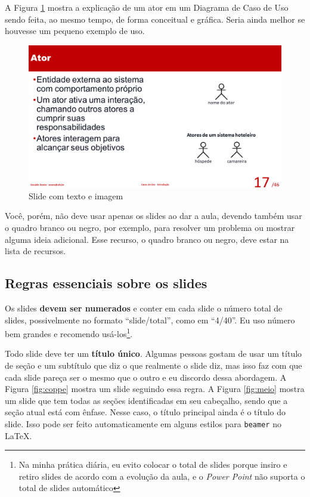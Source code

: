 \documentclass{article}
\def\tam{0.6}
\begin{document}
A Figura \ref{fig:teximag} mostra a explicação de um ator em um Diagrama de Caso de Uso sendo feita, ao mesmo tempo, de forma conceitual e gráfica. Seria ainda melhor se houvesse um pequeno exemplo de uso.

\begin{figure}[hbt]
    \centering
    \includegraphics[width=\tam\linewidth]{imagens/slidecomimage.png}
    \caption{Slide com texto e imagem}
    \label{fig:teximag}
\end{figure}

Você, porém, não deve usar apenas os slides ao dar a aula, devendo também usar o quadro branco ou negro, por exemplo, para resolver um problema ou mostrar alguma ideia adicional. Esse recurso, o quadro branco ou negro, deve estar na lista de recursos. 


\subsection{Regras essenciais sobre os slides}

Os slides \textbf{devem ser numerados} e conter em cada slide o número total de slides, possivelmente no formato ``slide/total'', como em ``4/40''. Eu uso número bem grandes e recomendo usá-los\footnote{Na minha prática diária, eu evito colocar o total de slides porque insiro e retiro slides de acordo com a evolução da aula, e o \textit{Power Point} não suporta o  total de slides automático}.

Todo slide deve ter um \textbf{título único}. Algumas pessoas gostam de usar um título de seção e um subtítulo que diz o que realmente o slide diz, mas isso faz com que cada slide pareça ser o mesmo que o outro e eu discordo dessa abordagem. A Figura \ref{fig:coppe} mostra um slide seguindo essa regra. A Figura \ref{fig:meio} mostra um slide que tem todas as seções identificadas em seu cabeçalho, sendo que a seção atual está com ênfase. Nesse caso, o título principal ainda é o título do slide. Isso pode ser feito automaticamente em alguns estilos para \texttt{beamer} no \LaTeX.
\end{document}
